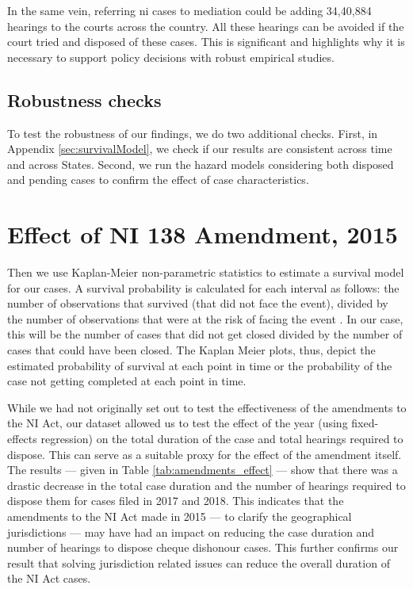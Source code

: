 In the same vein, referring \gls{ni} cases to mediation could be adding 34,40,884 hearings to the courts across the country. All these hearings can be avoided if the court tried and disposed of these cases. This is significant and highlights why it is necessary to support policy decisions with robust empirical studies.

\subsection{Robustness checks}

To test the robustness of our findings, we do two additional checks. First, in Appendix \ref{sec:survivalModel}, we check if our results are consistent across time and across States. Second, we run the hazard models considering both disposed and pending cases to confirm the effect of case characteristics.

\section{Effect of NI 138 Amendment, 2015}

Then we use Kaplan-Meier non-parametric statistics to estimate a survival model for our cases. A survival probability is calculated for each interval as follows: the number of observations that survived (that did not face the event), divided by the number of observations that were at the risk of facing the event \autocite{rich2010practical}. In our case, this will be the number of cases that did not get closed divided by the number of cases that could have been closed. The Kaplan Meier plots, thus, depict the estimated probability of survival at each point in time or the probability of the case not getting completed at each point in time.

While we had not originally set out to test the effectiveness of the amendments to the NI Act, our dataset allowed us to test the effect of the year (using fixed-effects regression) on the total duration of the case and total hearings required to dispose. This can serve as a suitable proxy for the effect of the amendment itself. The results --- given in Table \ref{tab:amendments_effect} --- show that there was a drastic decrease in the total case duration and the number of hearings required to dispose them for cases filed in 2017 and 2018. This indicates that the amendments to the NI Act made in 2015 --- to clarify the geographical jurisdictions --- may have had an impact on reducing the case duration and number of hearings to dispose cheque dishonour cases. This further confirms our result that solving jurisdiction related issues can reduce the overall duration of the NI Act cases.

